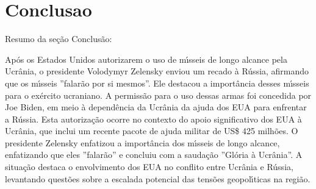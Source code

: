 \documentclass[article,11pt,oneside,a4paper,brazil,sumario=tradicional]{abntex2}%
\begin{document}
%
\section{Conclusao}%
\label{sec:Conclusao}%
Resumo da se\c{c}\~ao Conclus\~ao:

Ap\'os os Estados Unidos autorizarem o uso de m{\'\i}sseis de longo alcance pela Ucr\^ania, o presidente Volodymyr Zelensky enviou um recado \`a R\'ussia, afirmando que os m{\'\i}sseis ''falar\~ao por si mesmos''. Ele destacou a import\^ancia desses m{\'\i}sseis para o ex\'ercito ucraniano. A permiss\~ao para o uso dessas armas foi concedida por Joe Biden, em meio \`a depend\^encia da Ucr\^ania da ajuda dos EUA para enfrentar a R\'ussia. Esta autoriza\c{c}\~ao ocorre no contexto do apoio significativo dos EUA \`a Ucr\^ania, que inclui um recente pacote de ajuda militar de US\$ 425 milh\~oes. O presidente Zelensky enfatizou a import\^ancia dos m{\'\i}sseis de longo alcance, enfatizando que eles ''falar\~ao'' e concluiu com a sauda\c{c}\~ao ''Gl\'oria \`a Ucr\^ania''. A situa\c{c}\~ao destaca o envolvimento dos EUA no conflito entre Ucr\^ania e R\'ussia, levantando quest\~oes sobre a escalada potencial das tens\~oes geopol{\'\i}ticas na regi\~ao.

%
\end{document}
